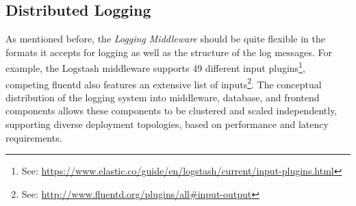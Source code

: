 \documentclass{llncs}
\begin{document}
\def\arraystretch{1.5}
\begin{table}[]
	\centering
	\caption{eduGAIN recommended attributes}
	\label{tab:eduGAIN-recommended-attributes}
\end{table}

\subsection{Distributed Logging}

As mentioned before, the \textit{Logging Middleware} should be quite flexible in the formats it accepts for logging as well as the structure of the log messages. For example, the Logstash middleware supports 49 different input plugins\footnote{See: \url{https://www.elastic.co/guide/en/logstash/current/input-plugins.html}}, competing fluentd also features an extensive list of inputs\footnote{See: \url{http://www.fluentd.org/plugins/all\#input-output}}. The conceptual distribution of the logging system into middleware, database, and frontend components allows these components to be clustered and scaled independently, supporting diverse deployment topologies, based on performance and latency requirements.
\end{document}
